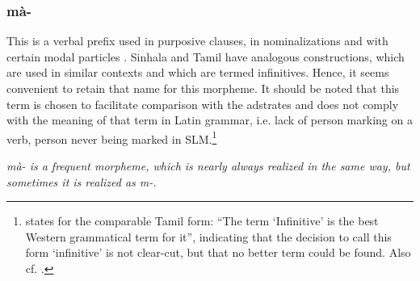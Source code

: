 

 
 
  
% 
 



\subsubsection{mà-}\label{sec:morph:ma-}
This is a verbal prefix used  in purposive clauses, in  nominalizations and with certain modal particles \citep[cf.][139f,144f]{Slomanson2007cll}. Sinhala and Tamil have analogous constructions, which are used in   similar contexts and which are termed infinitives. Hence, it seems convenient to retain that name for this morpheme. It should be noted that this term is chosen to facilitate comparison with the adstrates and does not comply with the meaning of that term in Latin grammar, i.e. lack of person marking on a verb, person never being marked in SLM.\footnote{\citep[196]{Arden1934} states for the comparable Tamil form: ``The term `Infinitive' is the best Western grammatical term for it'', indicating that the decision to call this form `infinitive' is not clear-cut, but that no better term could be found. Also cf. \citet[106]{Beythan1943}. }

\em mà- \em is a frequent morpheme, which is nearly always realized in the same way, but sometimes it is realized as \em m-\em.

